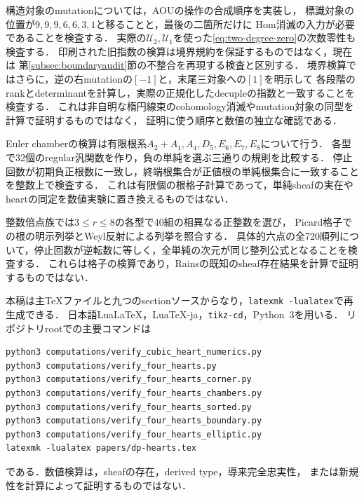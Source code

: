 構造対象のmutationについては，AOUの操作の合成順序を実装し，
標識対象の位置が$9,9,9,6,6,3,1$と移ることと，最後の二箇所だけに
Hom消滅の入力が必要であることを検査する．
実際の$\mathcal U_2,\mathcal U_1$を使った\eqref{eq:two-degree-zero}の次数零性も検査する．
印刷された旧指数の検算は境界規約を保証するものではなく，現在は
第\ref{subsec:boundaryaudit}節の不整合を再現する検査と区別する．
境界検算ではさらに，逆の右mutationの$[-1]$と，末尾三対象への$[1]$を明示して
各段階のrankとdeterminantを計算し，実際の正規化したdecupleの指数と一致することを検査する．
これは非自明な楕円線束のcohomology消滅やmutation対象の同型を計算で証明するものではなく，
証明に使う順序と数値の独立な確認である．

Euler chamberの検算は有限根系$A_2+A_1,A_4,D_5,E_6,E_7,E_8$について行う．
各型で32個のregular汎関数を作り，負の単純を選ぶ三通りの規則を比較する．
停止回数が初期負正根数に一致し，終端根集合が正値根の単純根集合に一致することを整数上で検査する．
これは有限個の根格子計算であって，単純sheafの実在やheartの同定を数値実験に置き換えるものではない．

整数倍点族では$3\le r\le8$の各型で40組の相異なる正整数を選び，
Picard格子での根の明示列挙とWeyl反射による列挙を照合する．
具体的六点の全720順列について，停止回数が逆転数に等しく，全単純の次元が同じ整列公式となることを検査する．
これらは格子の検算であり，Rainsの既知のsheaf存在結果を計算で証明するものではない．

本稿は主TeXファイルと九つのsectionソースからなり，\texttt{latexmk -lualatex}で再生成できる．
日本語LuaLaTeX，LuaTeX-ja，\texttt{tikz-cd}，Python~3を用いる．
リポジトリrootでの主要コマンドは
\begin{verbatim}
python3 computations/verify_cubic_heart_numerics.py
python3 computations/verify_four_hearts.py
python3 computations/verify_four_hearts_corner.py
python3 computations/verify_four_hearts_chambers.py
python3 computations/verify_four_hearts_sorted.py
python3 computations/verify_four_hearts_boundary.py
python3 computations/verify_four_hearts_elliptic.py
latexmk -lualatex papers/dp-hearts.tex
\end{verbatim}
である．数値検算は，sheafの存在，derived type，導来完全忠実性，
または新規性を計算によって証明するものではない．


